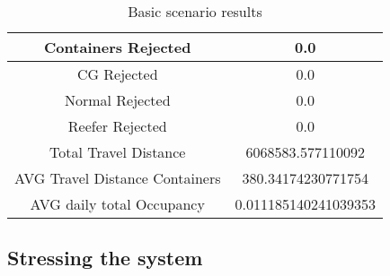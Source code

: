 \documentclass[]{article}
\begin{document}
\begin{table}[h]
      \centering
      \begin{tabular}{|c|c|}
            \hline
            Containers Rejected            & 0.0                  \\ \hline
            CG Rejected                    & 0.0                  \\ \hline
            Normal Rejected                & 0.0                  \\ \hline
            Reefer Rejected                & 0.0                  \\ \hline
            Total Travel Distance          & 6068583.577110092    \\ \hline
            AVG Travel Distance Containers & 380.34174230771754   \\ \hline
            AVG daily total Occupancy      & 0.011185140241039353 \\ \hline
      \end{tabular}
      \caption{Basic scenario results}
\end{table}

\subsection{Stressing the system}
\end{document}
